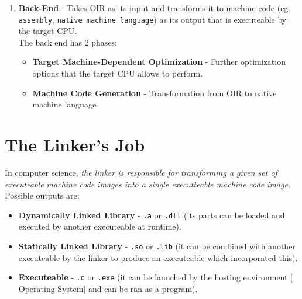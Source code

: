 \documentclass{article}
\begin{document}
\begin{enumerate}
  \item \textbf{Back-End} \-- Takes OIR as its input and transforms it to machine code (eg. \texttt{assembly}, \texttt{native machine language}) as its output that is executeable
  by the target CPU.
  \\
  The back end has 2 phases:
  \begin{itemize}
   \item \textbf{Target Machine-Dependent Optimization} \-- Further optimization options that the target CPU allows to perform.
   \item \textbf{Machine Code Generation} \-- Transformation from OIR to native machine language.
  \end{itemize}
 \end{enumerate}
 
 \section*{The Linker's Job}
 In computer science, \textsl{the linker is responsible for transforming a given set of executeable machine code images into a single executteable machine code image.} 
 Possible outputs are:
 
 \begin{itemize}
  \item \textbf{Dynamically Linked Library} \-- \texttt{.a} or \texttt{.dll} (its parts can be loaded and executed by another executeable at runtime).
  \item \textbf{Statically Linked Library} \-- \texttt{.so} or \texttt{.lib} (it can be combined with another executeable by the linker to produce an executeable which incorporated this).
  \item \textbf{Executeable} \-- \texttt{.o} or \texttt{.exe} (it can be launched by the hosting environment [ Operating System] and can be ran as a program).
 \end{itemize}
 
\end{document}
